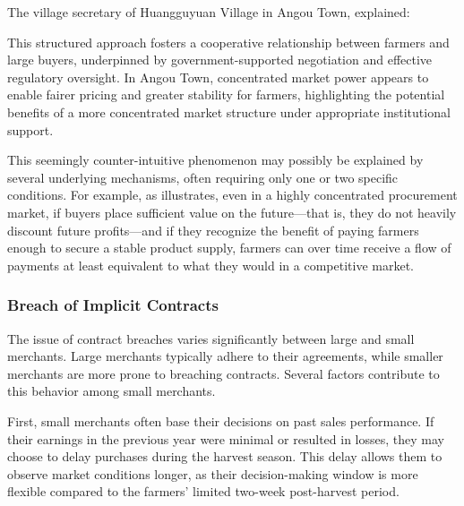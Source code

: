 The village secretary of Huangguyuan Village in Angou Town, explained:
\begin{quote}
\end{quote}
This structured approach fosters a cooperative relationship between farmers and large buyers, underpinned by government-supported negotiation and effective regulatory oversight. In Angou Town, concentrated market power appears to enable fairer pricing and greater stability for farmers, highlighting the potential benefits of a more concentrated market structure under appropriate institutional support.


This seemingly counter-intuitive phenomenon may possibly be explained by several underlying mechanisms, often requiring only one or two specific conditions. For example, as \citep{sexton2018increasing} illustrates, even in a highly concentrated procurement market, if buyers place sufficient value on the future—that is, they do not heavily discount future profits—and if they recognize the benefit of paying farmers enough to secure a stable product supply, farmers can over time receive a flow of payments at least equivalent to what they would in a competitive market.



\subsubsection{Breach of Implicit Contracts}
\noindent The issue of contract breaches varies significantly between large and small merchants. Large merchants typically adhere to their agreements, while smaller merchants are more prone to breaching contracts. Several factors contribute to this behavior among small merchants.

First, small merchants often base their decisions on past sales performance. If their earnings in the previous year were minimal or resulted in losses, they may choose to delay purchases during the harvest season. This delay allows them to observe market conditions longer, as their decision-making window is more flexible compared to the farmers' limited two-week post-harvest period.

